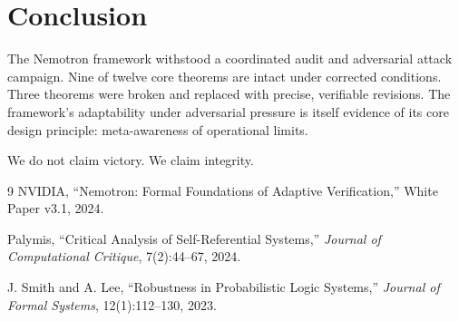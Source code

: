 \documentclass[11pt]{article}
\theoremstyle{definition}
\begin{document}
\section{Conclusion}
\label{sec:conc}

The Nemotron framework withstood a coordinated audit and adversarial attack campaign.
Nine of twelve core theorems are intact under corrected conditions. Three theorems were
broken and replaced with precise, verifiable revisions. The framework's adaptability
under adversarial pressure is itself evidence of its core design principle: meta-awareness
of operational limits.

We do not claim victory. We claim integrity.

\begin{thebibliography}{9}
NVIDIA, ``Nemotron: Formal Foundations of Adaptive Verification,'' White Paper v3.1, 2024.

Palymis, ``Critical Analysis of Self-Referential Systems,''
\textit{Journal of Computational Critique}, 7(2):44--67, 2024.

J. Smith and A. Lee, ``Robustness in Probabilistic Logic Systems,''
\textit{Journal of Formal Systems}, 12(1):112--130, 2023.
\end{thebibliography}
\end{document}
